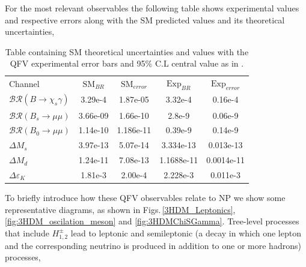 \documentclass[10pt]{report}
\begin{document}
For the most relevant observables the following table shows experimental values and respective errors along with the SM predicted values and its theoretical uncertainties, 
%
\begin{table}[H]
	\centering
	\begin{tabular}{l|cccc}
		Channel & $\text{SM}_{BR}$         & $\text{SM}_{error}$ & $\text{Exp}_{BR}$ & $\text{Exp}_{error}$   \\ \cline{1-5} 
		$\mathcal{BR} ( B \rightarrow \chi_s \gamma )$ & 3.29e-4 & 1.87e-05 & 3.32e-4 & 0.16e-4 \\
		$\mathcal{BR} ( B_s \rightarrow \mu \mu ) $ & 3.66e-09 & 1.66e-10 & 2.8e-9 & 0.06e-9       \\
		$\mathcal{BR} (B_0 \rightarrow  \mu \mu )$ & 1.14e-10 & 1.186e-11 & 0.39e-9    & 0.14e-9       \\
		$\Delta M_s$ & 3.97e-13 & 5.07e-14 & 3.334e-13  &  0.013e-13  \\
		$\Delta M_d $ & 1.24e-11 & 7.08e-13 & 1.1688e-11 &  0.0014e-11  \\
		$\Delta \varepsilon_K $ & 1.81e-3  & 2.00e-4 & 2.228e-3  & 0.011e-3     
	\end{tabular}
	\caption{Table containing SM theoretical uncertainties and values with the QFV experimental error bars and 95\% C.L central value as in \cite{Tanabashi2018}. }
\end{table}

To briefly introduce how these QFV observables relate to NP we show some representative diagrams, as shown in Figs.\,\ref{3HDM_Leptonics}, \ref{fig:3HDM_oscilation_meson} and \ref{fig:3HDMChiSGamma}. Tree-level processes that include $H^\pm_{1,2}$ lead to leptonic and semileptonic (a decay in which one lepton and the corresponding neutrino is produced in addition to one or more hadrons) processes,  
\end{document}

